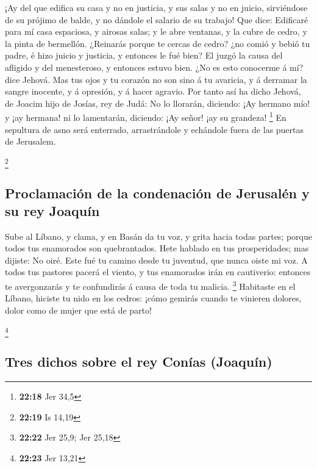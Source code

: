  ¡Ay del que edifica su casa y no en justicia, y sus
salas y no en juicio, sirviéndose de su prójimo de balde, y no dándole
el salario de su trabajo!  Que dice: Edificaré para mí
casa espaciosa, y airosas salas; y le abre ventanas, y la cubre de
cedro, y la pinta de bermellón.  ¿Reinarás porque te
cercas de cedro? ¿no comió y bebió tu padre, é hizo juicio y justicia, y
entonces le fué bien?  El juzgó la causa del afligido y
del menesteroso, y entonces estuvo bien. ¿No es esto conocerme á mí?
dice Jehová.  Mas tus ojos y tu corazón no son sino á tu
avaricia, y á derramar la sangre inocente, y á opresión, y á hacer
agravio.  Por tanto así ha dicho Jehová, de Joacim hijo
de Josías, rey de Judá: No lo llorarán, diciendo: ¡Ay hermano mío! y ¡ay
hermana! ni lo lamentarán, diciendo: ¡Ay señor! ¡ay su grandeza!
\footnote{\textbf{22:18} Jer 34,5}  En sepultura de asno
será enterrado, arrastrándole y echándole fuera de las puertas de
Jerusalem.

\footnote{\textbf{22:19} Is 14,19}

\hypertarget{proclamaciuxf3n-de-la-condenaciuxf3n-de-jerusaluxe9n-y-su-rey-joaquuxedn}{%
\subsection{Proclamación de la condenación de Jerusalén y su rey
Joaquín}\label{proclamaciuxf3n-de-la-condenaciuxf3n-de-jerusaluxe9n-y-su-rey-joaquuxedn}}

 Sube al Líbano, y clama, y en Basán da tu voz, y grita
hacia todas partes; porque todos tus enamorados son quebrantados.
 Hete hablado en tus prosperidades; mas dijiste: No oiré.
Este fué tu camino desde tu juventud, que nunca oiste mi voz.
 A todos tus pastores pacerá el viento, y tus enamorados
irán en cautiverio: entonces te avergonzarás y te confundirás á causa de
toda tu malicia. \footnote{\textbf{22:22} Jer 25,9; Jer 25,18}
 Habitaste en el Líbano, hiciste tu nido en los cedros:
¡cómo gemirás cuando te vinieren dolores, dolor como de mujer que está
de parto!

\footnote{\textbf{22:23} Jer 13,21}

\hypertarget{tres-dichos-sobre-el-rey-conuxedas-joaquuxedn}{%
\subsection{Tres dichos sobre el rey Conías
(Joaquín)}\label{tres-dichos-sobre-el-rey-conuxedas-joaquuxedn}}

